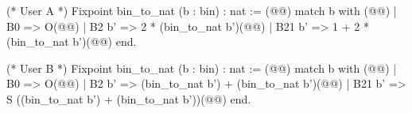 (* User A *)
Fixpoint bin_to_nat (b : bin) : nat := (@\vspace{-0.06cm}@)
  match b with (@\vspace{-0.06cm}@)
  | B0 => O(@\vspace{-0.06cm}@)
  | B2 b' => 2 * (bin_to_nat b')(@\vspace{-0.06cm}@)
  | B21 b' => 1 + 2 * (bin_to_nat b')(@\vspace{-0.06cm}@)
  end.

(* User B *)
Fixpoint bin_to_nat (b : bin) : nat := (@\vspace{-0.06cm}@)
  match b with (@\vspace{-0.06cm}@)
  | B0 => O(@\vspace{-0.06cm}@)
  | B2 b' => (bin_to_nat b') + (bin_to_nat b')(@\vspace{-0.06cm}@)
  | B21 b' => S ((bin_to_nat b') + (bin_to_nat b'))(@\vspace{-0.06cm}@)
  end.
